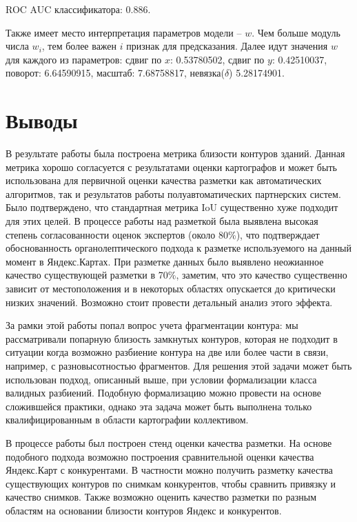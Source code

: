 \documentclass[12pt]{article}
\begin{document}
ROC AUC классификатора: 0.886.

Также имеет место интерпретация параметров модели -- $w$. Чем больше модуль числа $w_i$, тем более важен $i$ признак для предсказания. Далее идут значения $w$ для каждого из параметров:
сдвиг по $x$: 0.53780502, сдвиг по $y$: 0.42510037, поворот: 6.64590915, масштаб: 7.68758817, невязка($\delta$) 5.28174901.

\section{Выводы}
\label{conclusions}
В результате работы была построена метрика близости контуров зданий. Данная метрика хорошо согласуется с результатами оценки картографов и может быть использована для первичной оценки качества разметки как автоматических алгоритмов, так и результатов работы полуавтоматических партнерских систем. Было подтверждено, что стандартная метрика IoU существенно хуже подходит для этих целей. В процессе работы над разметкой была выявлена высокая степень согласованности оценок экспертов (около 80\%), что подтверждает обоснованность органолептического подхода к разметке используемого на данный момент в Яндекс.Картах. При разметке данных было выявлено неожианное качество существующей разметки в 70\%, заметим, что это качество существенно зависит от местоположения и в некоторых областях опускается до критически низких значений. Возможно стоит провести детальный анализ этого эффекта.

За рамки этой работы попал вопрос учета фрагментации контура: мы рассматривали попарную близость замкнутых контуров, которая не подходит в ситуации когда возможно разбиение контура на две или более части в связи, например, с разновысотностью фрагментов. Для решения этой задачи может быть использован подход, описанный выше, при условии формализации класса валидных разбиений. Подобную формализацию можно провести на основе сложившейся практики, однако эта задача может быть выполнена только квалифицированным в области картографии коллективом.

В процессе работы был построен стенд оценки качества разметки. На основе подобного подхода возможно построения сравнительной оценки качества Яндекс.Карт с конкурентами. В частности можно получить разметку качества существующих контуров по снимкам конкурентов, чтобы сравнить привязку и качество снимков. Также возможно оценить качество разметки по разным областям на основании близости контуров Яндекс и конкурентов.
\end{document}
